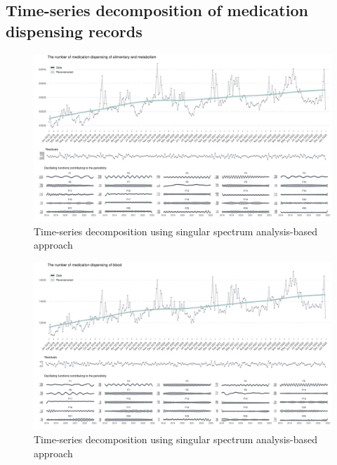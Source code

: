 \documentclass[
  letterpaper,
  DIV=11,
  numbers=noendperiod]{scrartcl}
\begin{document}
\normalpapersize

\subsection{Time-series decomposition of medication dispensing
records}\label{time-series-decomposition-of-medication-dispensing-records}

\begin{figure}[H]

{\centering \includegraphics[width=1\linewidth,height=\textheight,keepaspectratio]{supplementary_files/figure-pdf/unnamed-chunk-2-1.pdf}

}

\caption{Time-series decomposition using singular spectrum
analysis-based approach}

\end{figure}%

\begin{figure}[H]

{\centering \includegraphics[width=1\linewidth,height=\textheight,keepaspectratio]{supplementary_files/figure-pdf/unnamed-chunk-2-2.pdf}

}

\caption{Time-series decomposition using singular spectrum
analysis-based approach}

\end{figure}%
\end{document}
